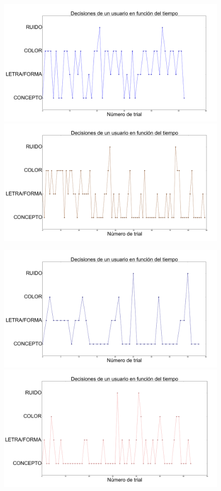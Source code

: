 \documentclass{beamer}
\begin{document}
\begin{frame}
\begin{figure}[h]
 \centering
  \begin{minipage}[c]{1\textwidth}
	\includegraphics[scale=0.108]{user3.png}
	\includegraphics[scale=0.108]{user13.png}
  \end{minipage}
  \begin{minipage}[c]{1\textwidth}
	\includegraphics[scale=0.108]{user8.png}
	\includegraphics[scale=0.108]{user11.png}

\end{minipage}
\end{figure}
\end{frame}
\end{document}
